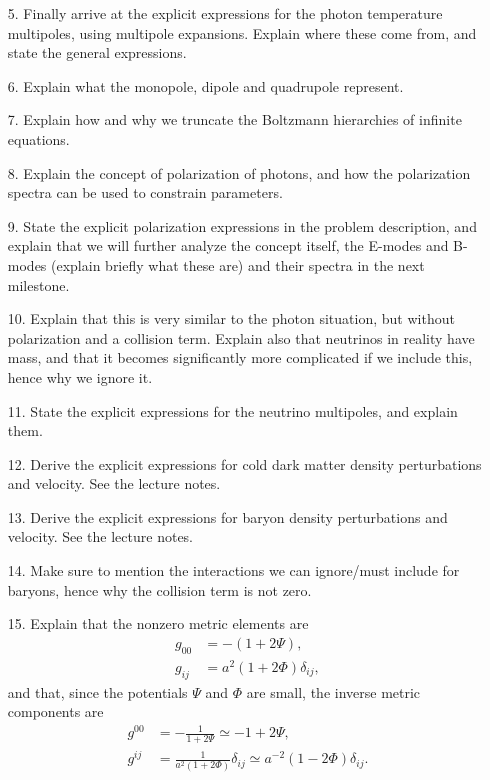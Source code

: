 \documentclass{aa}
\begin{document}
\begin{enumerate}
  \item [5.] Finally arrive at the explicit expressions for the photon temperature multipoles, using multipole expansions. Explain where these come from, and state the general expressions.
  \item [6.] Explain what the monopole, dipole and quadrupole represent.
  \item [7.] Explain how and why we truncate the Boltzmann hierarchies of infinite equations.
  \item [8.] Explain the concept of polarization of photons, and how the polarization spectra can be used to constrain parameters. 
  \item [9.] State the explicit polarization expressions in the problem description, and explain that we will further analyze the concept itself, the E-modes and B-modes (explain briefly what these are) and their spectra in the next milestone.
  \item [10.] Explain that this is very similar to the photon situation, but without polarization and a collision term. Explain also that neutrinos in reality have mass, and that it becomes significantly more complicated if we include this, hence why we ignore it.
  \item [11.] State the explicit expressions for the neutrino multipoles, and explain them.
  \item [12.] Derive the explicit expressions for cold dark matter density perturbations and velocity. See the lecture notes.
  \item [13.] Derive the explicit expressions for baryon density perturbations and velocity. See the lecture notes.
  \item [14.] Make sure to mention the interactions we can ignore/must include for baryons, hence why the collision term is not zero.
  \item [15.] Explain that the nonzero metric elements are
  \begin{align}
    g_{00} &= -\left(1+2\Psi \right),
    \\
    g_{ij} &= a^2\left(1+2\Phi \right)\delta_{ij},
  \end{align}
  and that, since the potentials $\Psi$ and $\Phi$ are small, the inverse metric components are
  \begin{align}
    g^{00} &= -\frac{1}{1+2\Psi} \simeq -1+2\Psi,
    \\
    g^{ij} &= \frac{1}{a^2\left(1+2\Phi \right)}\delta_{ij} \simeq a^{-2}\left(1-2\Phi\right)\delta_{ij}.
  \end{align}

\end{enumerate}
\end{document}

